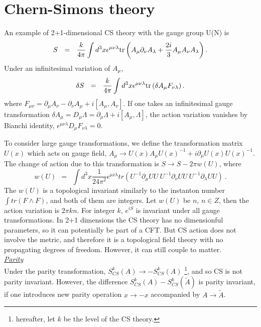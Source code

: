 \documentclass[12pt]{article}
\def\be{\begin{eqnarray}}\def\ba{\begin{eqnarray}}
\def\ee{\end{eqnarray}}\def\ea{\end{eqnarray}}
\begin{document}
\section{Chern-Simons theory}

An example of 2+1-dimensional CS theory with the gauge group U(N) is 
\be
S ~~=~~ \frac{k}{4 \pi} \int d^3 x \epsilon^{\mu\nu\lambda} {\rm tr}\left(A_\mu \partial_\nu A_\lambda + \frac{2i}{3} A_\mu A_\nu A_\lambda \right).
\ee
Under an infinitesimal variation of $A_\mu$,
\be
\delta S ~~=~~ \frac{k}{4 \pi} \int d^3 x \epsilon^{\mu\nu\lambda} {\rm tr}\left(\delta A_\mu F_{\nu\lambda} \right).
\ee
where $F_{\mu\nu}=\partial_\mu A_\nu - \partial_\nu A_\mu +i [A_\mu,A_\nu]$.
If one takes an infinitesimal gauge transformation $\delta A_\mu = D_\mu \Lambda = \partial_\mu \Lambda + i [A_\mu, \Lambda]$,
the action variation vanishes by Bianchi identity, $\epsilon^{\mu\nu\lambda}D_\mu F_{\nu \lambda} =0 $.

To consider large gauge transformations, we define the transformation matrix $U(x)$ which acts on gauge field, 
$A_\mu \rightarrow U(x) A_\mu U(x)^{-1}+ i \partial_\mu U(x) U(x)^{-1}$. 
The change of action due to this transformation is $ S \rightarrow S - 2 \pi  w(U) $, where 
\[ 
w(U)~~=~~ \int d^3 x \frac{1}{24 \pi^2} \epsilon^{\mu\nu\lambda} tr (U^{-1}\partial_\mu U U ~ U^{-1}\partial_\nu U U ~U^{-1}\partial_\lambda U U)~.
\] 
The $ w(U) $ is a topological invariant similarly to the instanton number $\int tr(F\wedge F)$, and both of them are integers. 
Let $w(U)$ be $n$, $n \in Z$, then the action variation is $2 \pi k n$. 
For integer $k$, $e^{i S}$ is invariant under all gauge transformations. 
In 2+1 dimensions the CS theory has no dimensionful parameters, so it can potentially be part of a CFT.
But CS action does not involve the metric, and therefore it is a topological field theory with no propagating degrees of freedom. 
However, it can still couple to matter.\\

\noindent\underline{\large \it Parity}\\
Under the parity transformation, $S^k_{CS}(A) \rightarrow -S^k_{CS}(A)$ \footnote{hereafter, let $k$ be the level of the CS theory.}, and so CS is not parity invariant. 
However, the difference  $S^k_{CS}(A) -S^k_{CS}(\tilde{A})$ is parity invariant, if one introduces new parity operation  $x \rightarrow -x $ accompanied by $A \rightarrow \tilde{A}$.\\
\end{document}
